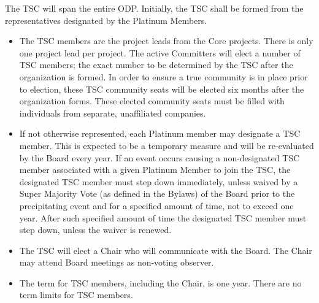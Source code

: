 \documentclass[a4paper, 12pt]{book}
\begin{document}
{
The TSC will span the entire ODP.  Initially, the TSC shall be formed from the representatives designated by the Platinum Members.
\begin{itemize}\itemsep0pt
\item{The TSC members are the project leads from the Core projects.  There is only one project lead per project. The active Committers will elect a number of TSC members; the exact number to be determined by the TSC after the organization is formed. In order to ensure a true community is in place prior to election, these TSC community seats will be elected six months after the organization forms. These elected community seats must be filled with individuals from separate, unaffiliated companies}.
\item{If not otherwise represented, each Platinum member may designate a TSC member. This is expected to be a temporary measure and will be re-evaluated by the Board every year. If an event occurs causing a non-designated TSC member associated with a given Platinum Member to join the TSC, the designated TSC member must step down immediately, unless waived by a Super Majority Vote (as defined in the Bylaws) of the Board prior to the precipitating event and for a specified amount of time, not to exceed one year. After such specified amount of time the designated TSC member must step down, unless the waiver is renewed}.
\item{The TSC will elect a Chair who will communicate with the Board.  The Chair may attend Board meetings as non-voting observer}.
\item{The term for TSC members, including the Chair, is one year.  There are no term limits for TSC members}.
\end{itemize}

}
\end{document}
